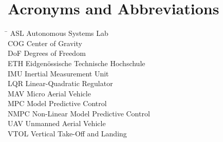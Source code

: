 \section*{Acronyms and Abbreviations}
\begin{tabbing}
 \hspace*{1.6cm}  \= \kill
 ASL \> Autonomous Systems Lab \\[0.5ex]
 COG \> Center of Gravity \\[0.5ex]
 DoF \> Degrees of Freedom \\[0.5ex]
 ETH \> Eidgenössische Technische Hochschule \\[0.5ex]
 IMU \> Inertial Measurement Unit \\[0.5ex]
 LQR \> Linear-Quadratic Regulator \\[0.5ex]
 MAV \> Micro Aerial Vehicle \\[0.5ex]
 MPC \> Model Predictive Control \\[0.5ex]
 NMPC \> Non-Linear Model Predictive Control \\[0.5ex]
 UAV \> Unmanned Aerial Vehicle \\[0.5ex]
 VTOL \> Vertical Take-Off and Landing \\[0.5ex]

\end{tabbing}